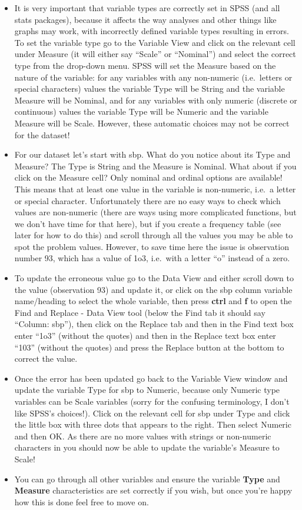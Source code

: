 \documentclass[
]{book}
\begin{document}
\begin{itemize}
\item
  It is very important that variable types are correctly set in SPSS (and all stats packages), because it affects the way analyses and other things like graphs may work, with incorrectly defined variable types resulting in errors. To set the variable type go to the Variable View and click on the relevant cell under Measure (it will either say ``Scale'' or ``Nominal'') and select the correct type from the drop-down menu. SPSS will set the Measure based on the nature of the variable: for any variables with any non-numeric (i.e.~letters or special characters) values the variable Type will be String and the variable Measure will be Nominal, and for any variables with only numeric (discrete or continuous) values the variable Type will be Numeric and the variable Measure will be Scale. However, these automatic choices may not be correct for the dataset!
\item
  For our dataset let's start with sbp. What do you notice about its Type and Measure? The Type is String and the Measure is Nominal. What about if you click on the Measure cell? Only nominal and ordinal options are available! This means that at least one value in the variable is non-numeric, i.e.~a letter or special character. Unfortunately there are no easy ways to check which values are non-numeric (there are ways using more complicated functions, but we don't have time for that here), but if you create a frequency table (see later for how to do this) and scroll through all the values you may be able to spot the problem values. However, to save time here the issue is observation number 93, which has a value of 1o3, i.e.~with a letter ``o'' instead of a zero.
\item
  To update the erroneous value go to the Data View and either scroll down to the value (observation 93) and update it, or click on the sbp column variable name/heading to select the whole variable, then press \textbf{ctrl} and \textbf{f} to open the Find and Replace - Data View tool (below the Find tab it should say ``Column: sbp''), then click on the Replace tab and then in the Find text box enter ``1o3'' (without the quotes) and then in the Replace text box enter ``103'' (without the quotes) and press the Replace button at the bottom to correct the value.
\item
  Once the error has been updated go back to the Variable View window and update the variable Type for sbp to Numeric, because only Numeric type variables can be Scale variables (sorry for the confusing terminology, I don't like SPSS's choices!). Click on the relevant cell for sbp under Type and click the little box with three dots that appears to the right. Then select Numeric and then OK. As there are no more values with strings or non-numeric characters in you should now be able to update the variable's Measure to Scale!
\item
  You can go through all other variables and ensure the variable \textbf{Type} and \textbf{Measure} characteristics are set correctly if you wish, but once you're happy how this is done feel free to move on.
\end{itemize}
\end{document}
